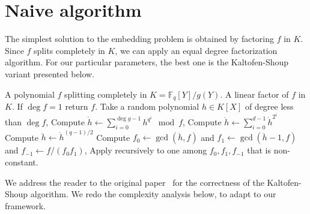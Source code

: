 \documentclass[12pt]{article}
\theoremstyle{plain}
\theoremstyle{definition}
\def\F{\ensuremath{\mathbb{F}}}
\newcounter{algorithm}
\begin{document}

\section{Naive algorithm}
\label{sec:description-naive}

The simplest solution to the embedding problem is obtained by
factoring $f$ in $K$. Since $f$ splits completely in $K$, we can apply
an equal degree factorization algorithm. For our particular
parameters, the best one is the Kaltofen-Shoup variant presented
below.

\begin{algorithm}
  \label{alg:ks}
  \begin{algorithmic}[1]
    \REQUIRE A polynomial $f$ splitting completely in $K=\F_q[Y]/g(Y)$.
    \ENSURE A linear factor of $f$ in $K$.
    \STATE If $\deg f = 1$ return $f$.
    \STATE Take a random polynomial $h\in K[X]$ of degree less than $\deg f$,
    \STATE\label{alg:ks-pseudotrace} Compute $\displaystyle\dot{h} \leftarrow \sum_{i=0}^{\deg g-1} h^{q^i} \mod f$,
    \STATE Compute $\displaystyle\ddot{h} \leftarrow \sum_{i=0}^{d-1} \dot{h}^{2^i}$
    \ELSE
    \STATE Compute $\ddot{h} \leftarrow \dot{h}^{(q-1)/2}$
    \ENDIF
    \STATE Compute $f_0\leftarrow\gcd(\ddot{h},f)$ and $f_1\leftarrow\gcd(\ddot{h}-1,f)$ and $f_{-1}\leftarrow f/(f_0f_1)$,
    \STATE Apply recursively to one among $f_0,f_1,f_{-1}$ that is non-constant.
  \end{algorithmic}
\end{algorithm}

We address the reader to the original paper~\cite{kaltofen+shoup97}
for the correctness of the Kaltofen-Shoup algorithm. We redo the
complexity analysis below, to adapt to our framework.
\end{document}
